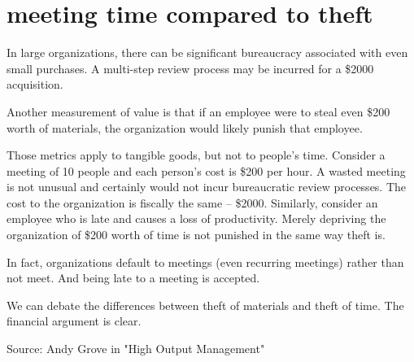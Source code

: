 \section{meeting time compared to theft}

In large organizations, there can be significant bureaucracy associated with even small purchases. A multi-step review process may be incurred for a \$2000 acquisition.

Another measurement of value is that if an employee were to steal even \$200 worth of materials, the organization would likely punish that employee.


Those metrics apply to tangible goods, but not to people's time. Consider a meeting of 10 people and each person's cost is \$200 per hour. A wasted meeting is not unusual and certainly would not incur bureaucratic review processes. The cost to the organization is fiscally the same -- \$2000. Similarly, consider an employee who is late and causes a loss of productivity. Merely depriving the organization of \$200 worth of time is not punished in the same way theft is.

In fact, organizations default to meetings (even recurring meetings) rather than not meet. And being late to a meeting is accepted. 

We can debate the differences between theft of materials and theft of time. The financial argument is clear. 

Source: Andy Grove in "High Output Management"